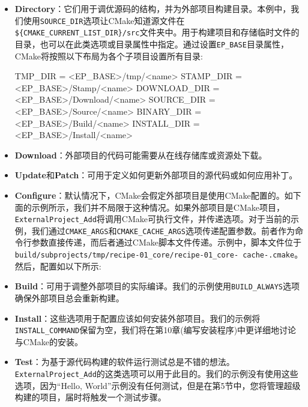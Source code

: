 \begin{itemize}
\item \textbf{Directory}：它们用于调优源码的结构，并为外部项目构建目录。本例中，我们使用\texttt{SOURCE\_DIR}选项让CMake知道源文件在\texttt{\$\{CMAKE\_CURRENT\_LIST\_DIR\}/src}文件夹中。用于构建项目和存储临时文件的目录，也可以在此类选项或目录属性中指定。通过设置\texttt{EP\_BASE}目录属性，CMake将按照以下布局为各个子项目设置所有目录:

\begin{codebox}[shell]
TMP_DIR = <EP_BASE>/tmp/<name>
STAMP_DIR = <EP_BASE>/Stamp/<name>
DOWNLOAD_DIR = <EP_BASE>/Download/<name>
SOURCE_DIR = <EP_BASE>/Source/<name>
BINARY_DIR = <EP_BASE>/Build/<name>
INSTALL_DIR = <EP_BASE>/Install/<name>
\end{codebox}

\item \textbf{Download}：外部项目的代码可能需要从在线存储库或资源处下载。

\item \textbf{Update}和\textbf{Patch}：可用于定义如何更新外部项目的源代码或如何应用补丁。

\item \textbf{Configure}：默认情况下，CMake会假定外部项目是使用CMake配置的。如下面的示例所示，我们并不局限于这种情况。如果外部项目是CMake项目，\texttt{ExternalProject\_Add}将调用CMake可执行文件，并传递选项。对于当前的示例，我们通过\texttt{CMAKE\_ARGS}和\texttt{CMAKE\_CACHE\_ARGS}选项传递配置参数。前者作为命令行参数直接传递，而后者通过CMake脚本文件传递。示例中，脚本文件位于\texttt{build/subprojects/tmp/recipe-01\_core/recipe-01\_core- cache-.cmake}。然后，配置如以下所示:


\item \textbf{Build}：可用于调整外部项目的实际编译。我们的示例使用\texttt{BUILD\_ALWAYS}选项确保外部项目总会重新构建。

\item \textbf{Install}：这些选项用于配置应该如何安装外部项目。我们的示例将\texttt{INSTALL\_COMMAND}保留为空，我们将在第10章(编写安装程序)中更详细地讨论与CMake的安装。

\item \textbf{Test}：为基于源代码构建的软件运行测试总是不错的想法。\texttt{ExternalProject\_Add}的这类选项可以用于此目的。我们的示例没有使用这些选项，因为“Hello, World”示例没有任何测试，但是在第5节中，您将管理超级构建的项目，届时将触发一个测试步骤。

\end{itemize}

